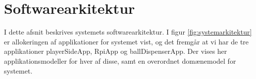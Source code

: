 \documentclass[Arkitektur/System_main.tex]{subfiles}
\begin{document}
\section{Softwarearkitektur}

I dette afsnit beskrives systemets softwarearkitektur. I figur \ref{fig:systemarkitektur} er allokeringen af applikationer for systemet vist, og det fremgår at vi har de tre applikationer playerSideApp, RpiApp og ballDispenserApp. Der vises her applikationsmodeller for hver af disse, samt en overordnet domænemodel for systemet.



\end{document}
